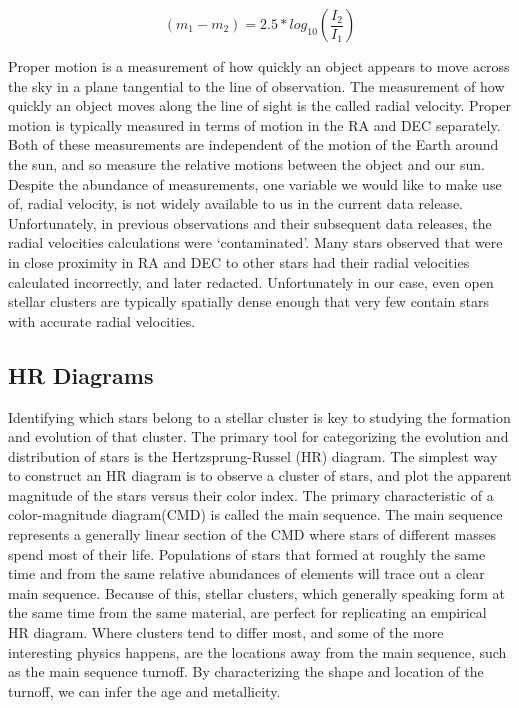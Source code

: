 \documentclass[onecolumn,table,xcdraw,super]{aastex631}
\newcommand{\beq}{\begin{equation}}
\newcommand{\eeq}{\end{equation}}
\begin{document}
\beq
\label{eq:int_mag}
\left(m_1-m_2\right) = 2.5*log_{10}\left(\frac{I_2}{I_1}\right)
\eeq

Proper motion is a measurement of how quickly an object appears to move across the sky in a plane tangential to the line of observation. The measurement of how quickly an object moves along the line of sight is the called radial velocity. Proper motion is typically measured in terms of motion in the RA and DEC separately. Both of these measurements are independent of the motion of the Earth around the sun, and so measure the relative motions between the object and our sun. Despite the abundance of measurements, one variable we would like to make use of, radial velocity, is not widely available to us in the current data release. Unfortunately, in previous observations and their subsequent data releases, the radial velocities calculations were `contaminated'. Many stars observed that were in close proximity in RA and DEC to other stars had their radial velocities calculated incorrectly, and later redacted. Unfortunately in our case, even open stellar clusters are typically spatially dense enough that very few contain stars with accurate radial velocities.



\subsection{HR Diagrams} \label{sec:hr}

Identifying which stars belong to a stellar cluster is key to studying the formation and evolution of that cluster. The primary tool for categorizing the evolution and distribution of stars is the Hertzsprung-Russel (HR) diagram. The simplest way to construct an HR diagram is to observe a cluster of stars, and plot the apparent magnitude of the stars versus their color index. The primary characteristic of a color-magnitude diagram(CMD) is called the main sequence. The main sequence represents a generally linear section of the CMD where stars of different masses spend most of their life. Populations of stars that formed at roughly the same time and from the same relative abundances of elements will trace out a clear main sequence. Because of this, stellar clusters, which generally speaking form at the same time from the same material, are perfect for replicating an empirical HR diagram. Where clusters tend to differ most, and some of the more interesting physics happens, are the locations away from the main sequence, such as the main sequence turnoff. By characterizing the shape and location of the turnoff, we can infer the age and metallicity.
\end{document}
